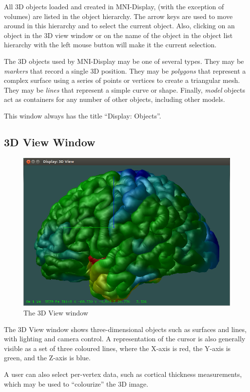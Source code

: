 \documentclass[11pt,letterpaper]{article}
\newcommand{\display}{\mbox{MNI-Display}}
\begin{document}
All 3D objects loaded and created in \display{},
(with the exception of volumes) are listed in the object hierarchy. The
arrow keys are used to move around in this hierarchy and to select the
current object. Also, clicking on an object in the 3D view window or on the
name of the object in the object list hierarchy with the left mouse button
will make it the current selection.

The 3D objects used by \display{} may be one of several types. They may
be {\em markers} that record a single 3D position. They may be {\em
 polygons} that represent a complex surface using a series of points
or vertices to create a triangular mesh. They may be {\em lines} that
represent a simple curve or shape. Finally, {\em model} objects act as containers for any number of other objects, including other models.

This window always has the title ``Display: Objects''.

\subsection{3D View Window}

\begin{figure}
\centering
\includegraphics[width=0.7\linewidth]{display-3d-view.png}
\caption{The 3D View window}
\label{win3Dview}
\end{figure}

The 3D View window shows three-dimensional objects such as surfaces and
lines, with lighting and camera control. A representation of the cursor is 
also generally visible as a set of three coloured lines, where the X-axis is red, the Y-axis is green, and the Z-axis is blue.

A user can also select per-vertex data, such as cortical thickness
measurements, which may be used to ``colourize'' the 3D image.
\end{document}
